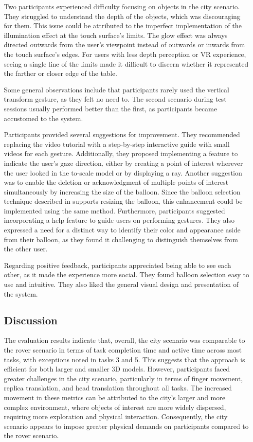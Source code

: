         Two participants experienced difficulty focusing on objects in the city scenario. They struggled to understand the depth of the objects, which was discouraging for them. This issue could be attributed to the imperfect implementation of the illumination effect at the touch surface's limits. The glow effect was always directed outwards from the user's viewpoint instead of outwards or inwards from the touch surface's edges. For users with less depth perception or VR experience, seeing a single line of the limits made it difficult to discern whether it represented the farther or closer edge of the table.

        Some general observations include that participants rarely used the vertical transform gesture, as they felt no need to. The second scenario during test sessions usually performed better than the first, as participants became accustomed to the system.

        Participants provided several suggestions for improvement. They recommended replacing the video tutorial with a step-by-step interactive guide with small videos for each gesture. Additionally, they proposed implementing a feature to indicate the user's gaze direction, either by creating a point of interest wherever the user looked in the to-scale model or by displaying a ray. Another suggestion was to enable the deletion or acknowledgment of multiple points of interest simultaneously by increasing the size of the balloon. Since the balloon selection technique described in \cite{benkoBalloonSelectionMultiFinger2007} supports resizing the balloon, this enhancement could be implemented using the same method. Furthermore, participants suggested incorporating a help feature to guide users on performing gestures. They also expressed a need for a distinct way to identify their color and appearance aside from their balloon, as they found it challenging to distinguish themselves from the other user.

        Regarding positive feedback, participants appreciated being able to see each other, as it made the experience more social. They found balloon selection easy to use and intuitive. They also liked the general visual design and presentation of the system.

    \subsection{Discussion}

        The evaluation results indicate that, overall, the city scenario was comparable to the rover scenario in terms of task completion time and active time across most tasks, with exceptions noted in tasks 3 and 5. This suggests that the approach is efficient for both larger and smaller 3D models. However, participants faced greater challenges in the city scenario, particularly in terms of finger movement, replica translation, and head translation throughout all tasks. The increased movement in these metrics can be attributed to the city's larger and more complex environment, where objects of interest are more widely dispersed, requiring more exploration and physical interaction. Consequently, the city scenario appears to impose greater physical demands on participants compared to the rover scenario.

